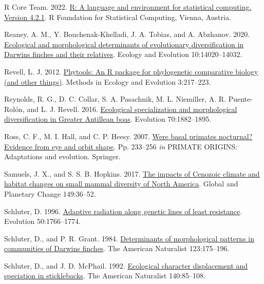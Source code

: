 \documentclass[
  11pt,
]{article}
\newlength{\cslhangindent}
\newlength{\cslentryspacingunit} %
\newenvironment{CSLReferences}[2] %
 {%
  \setlength{\parindent}{0pt}
  \ifodd #1
  \let\oldpar\par
  \def\par{\hangindent=\cslhangindent\oldpar}
  \fi
  \setlength{\parskip}{#2\cslentryspacingunit}
 }%
 {}
\begin{document}
\begin{CSLReferences}{1}{0}
\leavevmode{}%
R Core Team. 2022. \href{https://www.R-project.org/}{R: A language and
environment for statistical computing. Version 4.2.1}. R Foundation for
Statistical Computing, Vienna, Austria.

\leavevmode{}%
Reaney, A. M., Y. Bouchenak-Khelladi, J. A. Tobias, and A. Abzhanov.
2020. \href{https://doi.org/10.1002/ece3.6994}{Ecological and
morphological determinants of evolutionary diversification in
{D}arwin{\textquotesingle}s finches and their relatives}. Ecology and
Evolution 10:14020--14032.

\leavevmode{}%
Revell, L. J. 2012.
\href{https://doi.org/10.1111/j.2041-210X.2011.00169.x}{Phytools: An {R}
package for phylogenetic comparative biology (and other things)}.
Methods in Ecology and Evolution 3:217--223.

\leavevmode{}%
Reynolds, R. G., D. C. Collar, S. A. Pasachnik, M. L. Niemiller, A. R.
Puente-Rolón, and L. J. Revell. 2016.
\href{https://doi.org/10.1111/evo.12987}{{Ecological specialization and
morphological diversification in {G}reater {A}ntillean boas}}. Evolution
70:1882--1895.

\leavevmode{}%
Ross, C. F., M. I. Hall, and C. P. Heesy. 2007.
\href{https://doi.org/10.1007/978-0-387-33507-0_7}{Were basal primates
nocturnal? Evidence from eye and orbit shape}. Pp. 233--256 \emph{in}
PRIMATE ORIGINS: Adaptations and evolution. Springer.

\leavevmode{}%
Samuels, J. X., and S. S. B. Hopkins. 2017.
\href{https://doi.org/10.1016/j.gloplacha.2016.12.014}{{The impacts of
{C}enozoic climate and habitat changes on small mammal diversity of
{N}orth {A}merica}}. Global and Planetary Change 149:36--52.

\leavevmode{}%
Schluter, D. 1996.
\href{https://doi.org/10.1111/j.1558-5646.1996.tb03563.x}{Adaptive
radiation along genetic lines of least resistance}. Evolution
50:1766--1774.

\leavevmode{}%
Schluter, D., and P. R. Grant. 1984.
\href{https://doi.org/10.1086/284196}{Determinants of morphological
patterns in communities of {D}arwin{\textquotesingle}s finches}. The
American Naturalist 123:175--196.

\leavevmode{}%
Schluter, D., and J. D. McPhail. 1992.
\href{https://doi.org/10.1086/285404}{Ecological character displacement
and speciation in sticklebacks}. The American Naturalist 140:85--108.


\end{CSLReferences}
\end{document}
